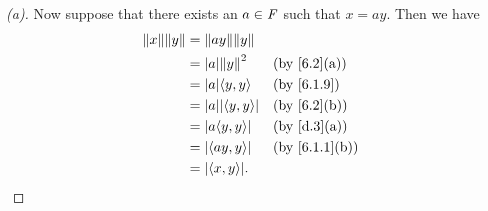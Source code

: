 \begin{proof}[(a)]
  Now suppose that there exists an \(a \in \mathit{F}\) such that \(x = ay\).
  Then we have
  \begin{align*}
    \norm{x} \norm{y} & = \norm{ay} \norm{y}                                        \\
                      & = \abs{a} \norm{y}^2       &  & \text{(by \cref{6.2}(a))}   \\
                      & = \abs{a} \inn{y, y}       &  & \text{(by \cref{6.1.9})}    \\
                      & = \abs{a} \abs{\inn{y, y}} &  & \text{(by \cref{6.2}(b))}   \\
                      & = \abs{a \inn{y, y}}       &  & \text{(by \cref{d.3}(a))}   \\
                      & = \abs{\inn{ay, y}}        &  & \text{(by \cref{6.1.1}(b))} \\
                      & = \abs{\inn{x, y}}.
  \end{align*}
\end{proof}


